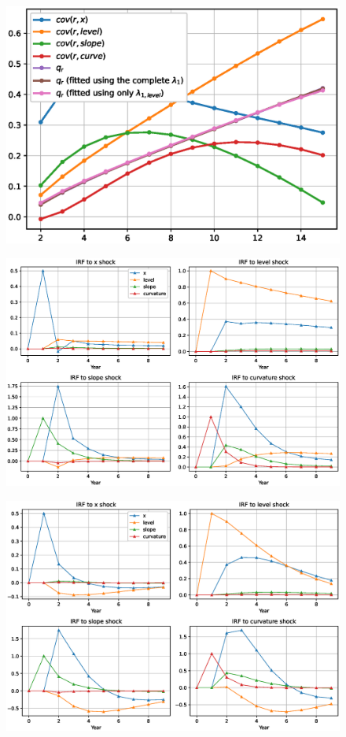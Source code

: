 \documentclass{amsart}
\begin{document}
	\begin{figure}[h!]
		\centering
		\includegraphics[scale=0.5]{fig/eps/Figure6.eps}
	\end{figure}

	\begin{figure}[h!]
		\centering
		\includegraphics[scale=0.5]{fig/eps/Figure7.eps}
	\end{figure}

	\begin{figure}[h!]
		\centering
		\includegraphics[scale=0.5]{fig/eps/Figure8.eps}
	\end{figure}
\end{document}
